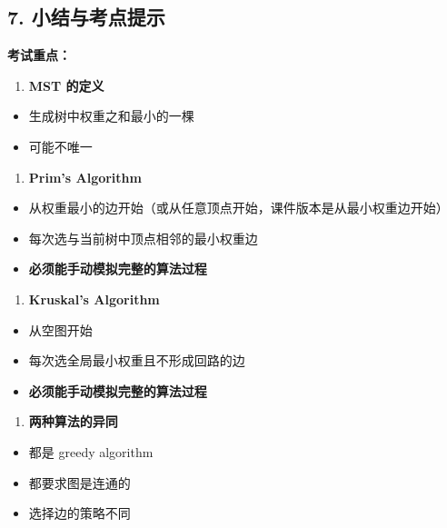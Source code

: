 \documentclass[10pt,a4paper,openany]{ctexbook}
\theoremstyle{definition}
\theoremstyle{remark}
\begin{document}
\vspace{-2pt}

\subsection{7. 小结与考点提示}

\textbf{考试重点：}
\begin{enumerate}
\item \textbf{MST 的定义}
\end{enumerate}

\begin{itemize}
\item 生成树中权重之和最小的一棵
\item 可能不唯一

\end{itemize}

\begin{enumerate}
\item \textbf{Prim's Algorithm}
\end{enumerate}

\begin{itemize}
\item 从权重最小的边开始（或从任意顶点开始，课件版本是从最小权重边开始）
\item 每次选与当前树中顶点相邻的最小权重边
\item \textbf{必须能手动模拟完整的算法过程}

\end{itemize}

\begin{enumerate}
\item \textbf{Kruskal's Algorithm}
\end{enumerate}

\begin{itemize}
\item 从空图开始
\item 每次选全局最小权重且不形成回路的边
\item \textbf{必须能手动模拟完整的算法过程}

\end{itemize}

\begin{enumerate}
\item \textbf{两种算法的异同}
\end{enumerate}

\begin{itemize}
\item 都是 greedy algorithm
\item 都要求图是连通的
\item 选择边的策略不同

\end{itemize}
\end{document}
